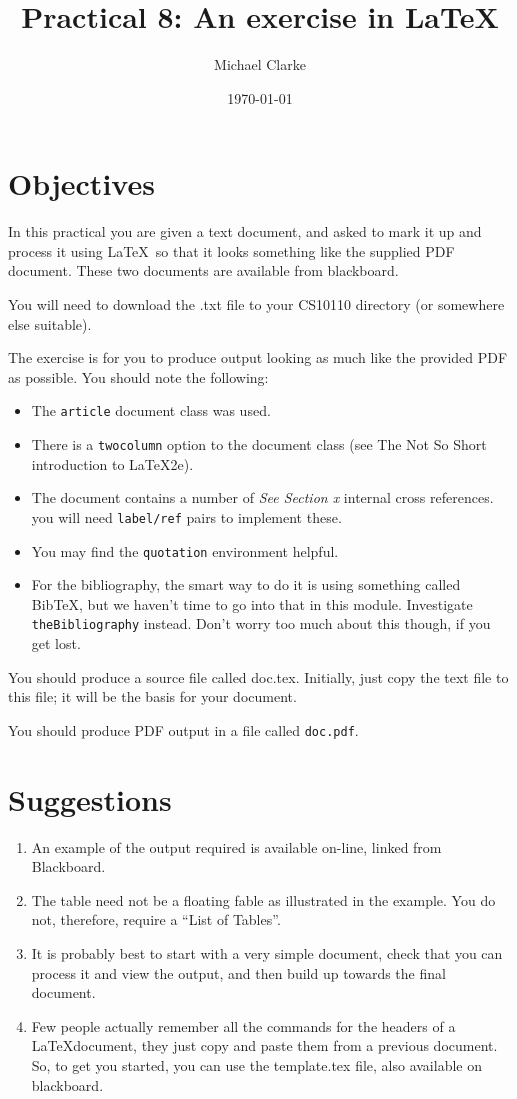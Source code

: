\documentclass{article}
\title{Practical 8: An exercise in \LaTeX}
\author{Michael Clarke}
\date{\today}
\begin{document}
\maketitle

\section{Objectives}
In this practical you are given a text document, and asked to mark it up and
process it using \LaTeX\ so that it looks something like the supplied PDF
document. These two documents are available from blackboard.

You will need to download the .txt file to your CS10110 directory (or somewhere else suitable).

The exercise is for you to produce output looking as much like the provided PDF 
as possible. You should note the following:

\begin{itemize}
\item The \verb|article| document class was used.
\item There is a \verb|twocolumn| option to the document class (see The Not So Short introduction to \LaTeX2e).
\item The document contains a number of {\em See Section x} internal cross references. you will need \verb|label/ref| pairs to implement these.
\item You may find the \verb|quotation| environment helpful.
\item For the bibliography, the smart way to do it is using something called BibTeX, but we haven't time to go into that in this module. Investigate \verb|theBibliography| instead. Don't worry too much about this though, if you get lost.
\end{itemize}

You should produce a source file called doc.tex. Initially, just copy the text file to this file; it will be the basis for your document.

You should produce PDF output in a file called \verb|doc.pdf|.

\section{Suggestions}
\begin{enumerate}
\item An example of the output required is available on-line, linked from Blackboard.
\item The table need not be a floating fable as illustrated in the example. You do not, therefore, require a ``List of Tables''.
\item It is probably best to start with a very simple document, check that you can process it and view the output, and then build up towards the final document.
\item Few people actually remember all the commands for the headers of a \LaTeX document, they just copy and paste them from a previous document. So, to get you started, you can use the template.tex file, also available on blackboard.
\end{enumerate}
\end{document}
